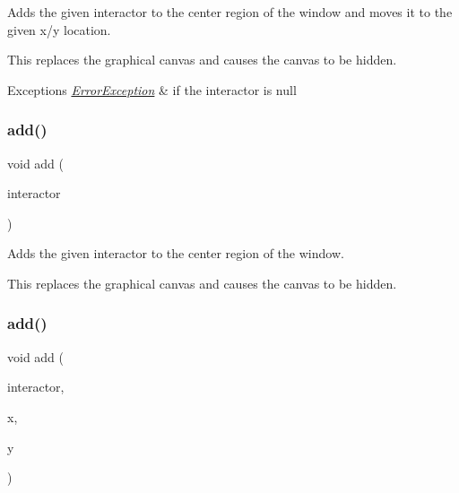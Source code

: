 Adds the given interactor to the center region of the window and moves it to the given x/y location. 

This replaces the graphical canvas and causes the canvas to be hidden. 
\begin{DoxyExceptions}{Exceptions}
{\em \mbox{\hyperlink{classErrorException}{Error\+Exception}}} & if the interactor is null \\
\hline
\end{DoxyExceptions}
\mbox{\label{classGWindow_a33b08fe5428ed634a658deab076099f7}} 
\subsubsection{\texorpdfstring{add()}{add()}\hspace{0.1cm}{\footnotesize\ttfamily [3/8]}}
{\footnotesize\ttfamily void add (\begin{DoxyParamCaption}\item[{\mbox{\hyperlink{classGInteractor}{G\+Interactor}} \&}]{interactor }\end{DoxyParamCaption})\hspace{0.3cm}{\ttfamily [virtual]}}



Adds the given interactor to the center region of the window. 

This replaces the graphical canvas and causes the canvas to be hidden. \mbox{\label{classGWindow_a56840f453f9938083c24c7fb1a4c377e}} 
\subsubsection{\texorpdfstring{add()}{add()}\hspace{0.1cm}{\footnotesize\ttfamily [4/8]}}
{\footnotesize\ttfamily void add (\begin{DoxyParamCaption}\item[{\mbox{\hyperlink{classGInteractor}{G\+Interactor}} \&}]{interactor,  }\item[{double}]{x,  }\item[{double}]{y }\end{DoxyParamCaption})\hspace{0.3cm}{\ttfamily [virtual]}}



